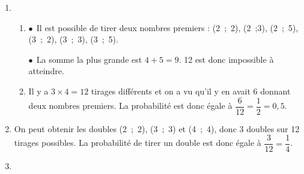 \begin{enumerate}
\item %

	\begin{enumerate}
		\item %
$\bullet~~$Il est possible de tirer deux nombres premiers : (2~;~2), (2~;3), (2~;~5), (3~;~2), (3~;~3), (3~;~5).

$\bullet~~$La somme la plus grande est $4 + 5 = 9$. 12 est donc impossible à atteindre.
		\item %
Il y a $3 \times 4 = 12$ tirages différents et on a vu qu'il y en avait 6 donnant deux nombres premiers. La probabilité est donc égale à $\dfrac{6}{12} = \dfrac{1}{2} = 0,5$.
	\end{enumerate}
\item %

On peut obtenir les doubles (2~;~2), (3~;~3) et (4~;~4), donc 3 doubles sur 12 tirages possibles. La probabilité de tirer un double est donc égale à $\dfrac{3}{12} = \dfrac{1}{4}$.
\item %




\end{enumerate}
